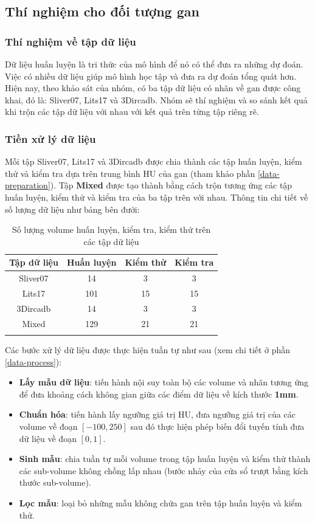 \subsection{Thí nghiệm cho đối tượng gan}
\subsubsection{Thí nghiệm về tập dữ liệu} \label{liver-dataset-exp}
Dữ liệu huấn luyện là tri thức của mô hình để nó có thể đưa ra những dự đoán. Việc có nhiều dữ liệu giúp mô hình học tập và đưa ra dự đoán tổng quát hơn. Hiện nay, theo khảo sát của nhóm, có ba tập dữ liệu có nhãn về gan được công khai, đó là: Sliver07, Lits17 và 3Dircadb. Nhóm sẽ thí nghiệm và so sánh kết quả khi trộn các tập dữ liệu với nhau với kết quả trên từng tập riêng rẽ.

\subsubsection{Tiền xử lý dữ liệu}
Mỗi tập Sliver07, Lits17 và 3Dircadb được chia thành các tập huấn luyện, kiểm thử và kiểm tra dựa trên trung bình HU của gan (tham khảo phần \ref{data-preparation}). Tập \textbf{Mixed} được tạo thành bằng cách trộn tương ứng các tập huấn luyện, kiểm thử và kiểm tra của ba tập trên với nhau. Thông tin chi tiết về số lượng dữ liệu như bảng bên đưới:\par
\begin{table}[H]
\renewcommand{\arraystretch}{1.2}
\centering
\begin{tabular}{c|c|c|c} 
\Xhline{3\arrayrulewidth}
 \textbf{Tập dữ liệu} & \textbf{Huấn luyện} & \textbf{Kiểm thử} & \textbf{Kiểm tra} \\ 
 \hline
 Sliver07 & 14 & 3 & 3 \\ 
 \hline
 Lits17 & 101 & 15 & 15 \\ 
 \hline
 3Dircadb & 14 & 3 & 3 \\ 
 \hline
 Mixed & 129 & 21 & 21 \\ 
\Xhline{3\arrayrulewidth}
\end{tabular}
\caption{Số lượng volume huấn luyện, kiểm tra, kiểm thử trên các tập dữ liệu}
\end{table}
\raggedbottom
Các bước xử lý dữ liệu được thực hiện tuần tự như sau (xem chi tiết ở phần \ref{data-process}):
\begin{itemize}[noitemsep, topsep=0pt]
    \item \textbf{Lấy mẫu dữ liệu}: tiến hành nội suy toàn bộ các volume và nhãn tương ứng để đưa khoảng cách không gian giữa các điểm dữ liệu về kích thước \textbf{1mm}.
    \item \textbf{Chuẩn hóa}: tiến hành lấy ngưỡng giá trị HU, đưa ngưỡng giá trị của các volume về đoạn $[-100, 250]$ sau đó thực hiện phép biến đổi tuyến tính đưa dữ liệu về đoạn $[0, 1]$.
    \item \textbf{Sinh mẫu}: chia tuần tự mỗi volume trong tập huấn luyện và kiểm thử thành các sub-volume không chồng lấp nhau (bước nhảy của cửa sổ trượt bằng kích thước sub-volume).
    \item \textbf{Lọc mẫu}: loại bỏ những mẫu không chứa gan trên tập huấn luyện và kiểm thử.
\end{itemize}


